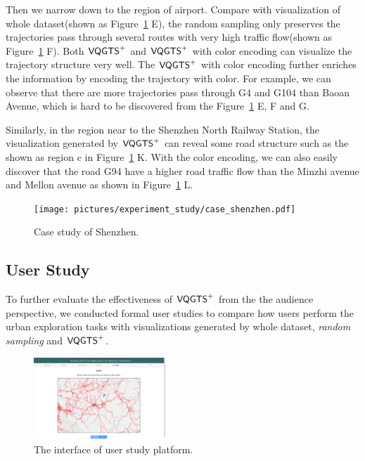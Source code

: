 Then we narrow down to the region of airport. Compare with visualization of whole dataset(shown as Figure~\ref{fig:shenzhen} E), the random sampling only preserves the trajectories pass through several routes with very high traffic flow(shown as Figure~\ref{fig:shenzhen} F).  Both $\mathsf{VQGTS}^{+}$ and $\mathsf{VQGTS}^{+}$ with color encoding can visualize the trajectory structure very well. The $\mathsf{VQGTS}^{+}$ with color encoding further enriches the information by encoding the trajectory with color. For example, we can observe that there are more trajectories pass through G4 and G104 than Baoan Avenue, which is hard to be discovered from the Figure~\ref{fig:shenzhen} E, F and G.

Similarly, in the region near to the Shenzhen North Railway Station, the visualization generated by $\mathsf{VQGTS}^{+}$ can reveal some road structure such as the  shown as region c in Figure~\ref{fig:shenzhen} K. With the color encoding, we can also easily discover that the road G94 have a higher road traffic flow than the Minzhi avenue and Mellon avenue as shown in Figure~\ref{fig:shenzhen} L.

\begin{figure}[t]
	\centering
	\vspace{2mm}
	\texttt{[image: pictures/experiment\_study/case\_shenzhen.pdf]}
	\caption{Case study of Shenzhen.}
	\vspace{0mm}
	\label{fig:shenzhen}
\end{figure}


\subsection{User Study}
To further evaluate the effectiveness of $\mathsf{VQGTS}^{+}$ from the the audience perspective, we conducted formal user studies to compare how users perform the urban exploration tasks with visualizations generated by whole dataset, \textit{random sampling} and $\mathsf{VQGTS}^{+}$.


\begin{figure}[t]
	\centering
	\includegraphics[width=0.44\textwidth]{pictures/user_study/interface.jpg}
	\vspace{-3mm}
	\caption{The interface of user study platform.}
	\vspace{-5mm}
	\label{fig:user_study}
\end{figure}

